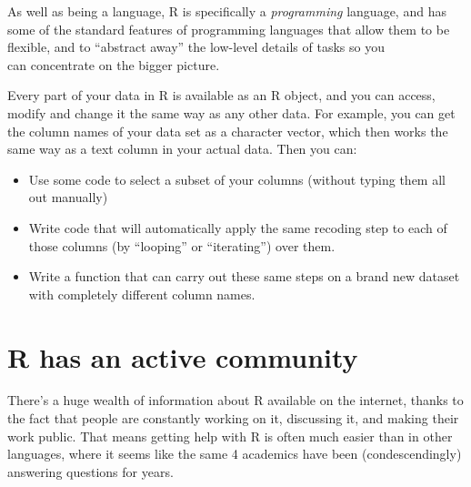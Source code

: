 \documentclass[
]{book}
\providecommand{\tightlist}{%
  \setlength{\itemsep}{0pt}\setlength{\parskip}{0pt}}
\begin{document}
As well as being a language, R is specifically a \emph{programming} language, and
has some of the standard features of programming languages that allow them
to be flexible, and to ``abstract away'' the low-level details of tasks so you\\
can concentrate on the bigger picture.

Every part of your data in R is available as an R object, and you can
access, modify and change it the same way as any other data.
For example, you can get the column names of your data set as a
character vector, which then works the same way as a text column
in your actual data. Then you can:

\begin{itemize}
\tightlist
\item
  Use some code to select a subset of your columns (without typing them
  all out manually)
\item
  Write code that will automatically apply the same recoding step to each
  of those columns (by ``looping'' or ``iterating'') over them.
\item
  Write a function that can carry out these same steps on a brand
  new dataset with completely different column names.
\end{itemize}

\hypertarget{r-has-an-active-community}{%
\section*{R has an active community}\label{r-has-an-active-community}}

There's a huge wealth of information about R available on the internet,
thanks to the fact that people are constantly working on it, discussing it,
and making their work public. That means getting help with R is often much
easier than in other languages, where it seems like the same 4 academics
have been (condescendingly) answering questions for years.

  
\end{document}
